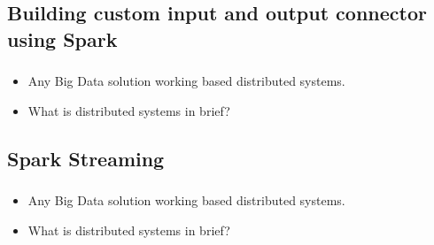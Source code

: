 

\subsection{Building custom input and output connector using Spark}

\begin{frame}
\frametitle{\subsecname}
\begin{itemize} 
	\item Any Big Data solution working based distributed systems.
	\item What is distributed systems in brief?
\end{itemize}
\end{frame}



\subsection{Spark Streaming}


\begin{frame}
  \frametitle{\subsecname}
	\begin{itemize} 
		\item Any Big Data solution working based distributed systems.
		\item What is distributed systems in brief?
	\end{itemize}
\end{frame}



